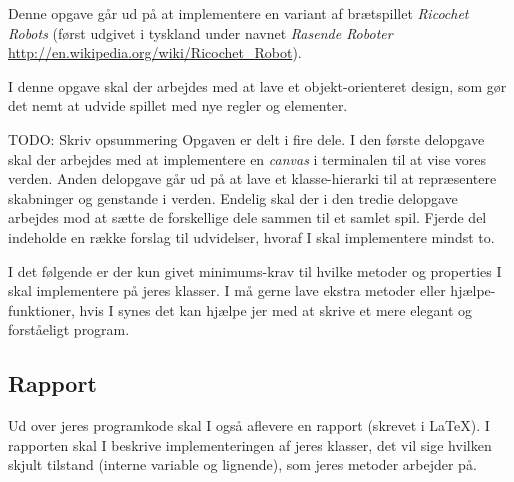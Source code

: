 
\newcommand{\exampleboard}{%
  \draw[step=10mm,color=gray,thin] (0,0) grid (7,-4);
  \draw[ultra thick] (0,0) rectangle (7,-4);
  \foreach \col in {1,...,7} {
    \node at (\col-0.5, 0.25) {\footnotesize\col};
  };
  \foreach \row in {1,...,4} {
    \node at (-0.25, 0.5-\row) {\footnotesize\row};
  };
  \draw[line width=3pt] (2,-2) -- (3,-2) -- (3,-1) -- (5,-1);
  \node at (5.5,-2.5) {\footnotesize{}goal};
}


\newcommand*{\TODO}[1]{\textsf{TODO: #1}}

Denne opgave går ud på at implementere en variant af brætspillet
\emph{Ricochet Robots} (først udgivet i tyskland under navnet
\emph{Rasende Roboter}
\url{http://en.wikipedia.org/wiki/Ricochet_Robot}).

I denne opgave skal der arbejdes med at lave et objekt-orienteret
design, som gør det nemt at udvide spillet med nye regler og elementer.

\TODO{Skriv opsummering} Opgaven er delt i fire dele. I den første delopgave skal der arbejdes
med at implementere en \emph{canvas} i terminalen til at vise vores
verden. Anden delopgave går ud på at lave et klasse-hierarki til at
repræsentere skabninger og genstande i verden. Endelig skal der i den
tredie delopgave arbejdes mod at sætte de forskellige dele sammen til
et samlet spil. Fjerde del indeholde en række forslag til udvidelser,
hvoraf I skal implementere mindst to.

I det følgende er der kun givet minimums-krav til hvilke metoder og
properties I skal implementere på jeres klasser. I må gerne lave
ekstra metoder eller hjælpe-funktioner, hvis I synes det kan hjælpe
jer med at skrive et mere elegant og forståeligt program.


\subsection*{Rapport}


Ud over jeres programkode skal I også aflevere en rapport (skrevet i
\LaTeX). I rapporten skal I beskrive implementeringen af jeres
klasser, det vil sige hvilken skjult tilstand (interne variable og
lignende), som jeres metoder arbejder på.

